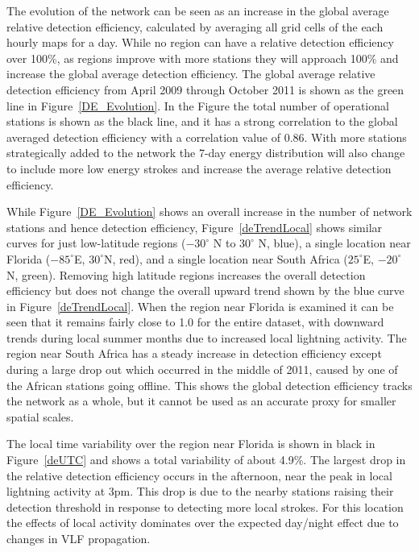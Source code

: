 \documentclass[draft,ras]{agutex}
\begin{document}
\begin{article}
The evolution of the network can be seen as an increase in the global average relative detection efficiency, calculated by averaging all grid cells of the each hourly maps for a day. While no region can have a relative detection efficiency over 100\%, as regions improve with more stations they will approach 100\% and increase the global average detection efficiency. The global average relative detection efficiency from April 2009 through October 2011 is shown as the green line in Figure~\ref{DE_Evolution}. In the Figure the total number of operational stations is shown as the black line, and it has a strong correlation to the global averaged detection efficiency with a correlation value of 0.86. With more stations strategically added to the network the 7-day energy distribution will also change to include more low energy strokes and increase the average relative detection efficiency. 

While Figure~\ref{DE_Evolution} shows an overall increase in the number of network stations and hence detection efficiency, Figure~\ref{deTrendLocal} shows similar curves for just low-latitude regions ($-30^\circ$ N to $30^\circ$ N, blue), a single location near Florida ($-85^\circ$E, $30^\circ$N, red), and a single location near South Africa ($25^\circ$E, $-20^\circ$N, green). Removing high latitude regions increases the overall detection efficiency but does not change the overall upward trend shown by the blue curve in Figure~\ref{deTrendLocal}. When the region near Florida is examined it can be seen that it remains fairly close to 1.0 for the entire dataset, with downward trends during local summer months due to increased local lightning activity. The region near South Africa has a steady increase in detection efficiency except during a large drop out which occurred in the middle of 2011, caused by one of the African stations going offline. This shows the global detection efficiency tracks the network as a whole, but it cannot be used as an accurate proxy for smaller spatial scales.

The local time variability over the region near Florida is shown in black in Figure~\ref{deUTC} and shows a total variability of about 4.9\%. The largest drop in the relative detection efficiency occurs in the afternoon, near the peak in local lightning activity at 3pm. This drop is due to the nearby stations raising their detection threshold in response to detecting more local strokes. For this location the effects of local activity dominates over the expected day/night effect due to changes in VLF propagation.


\end{article}
\end{document}
